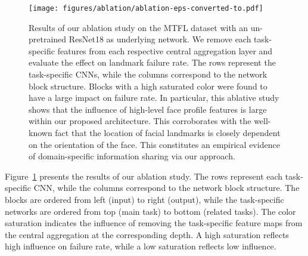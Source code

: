 \documentclass[runningheads]{llncs}
\begin{document}
\begin{figure}[t]
    \centering
    \texttt{[image: figures/ablation/ablation-eps-converted-to.pdf]}
    \caption{Results of our ablation study on the MTFL dataset with an un-pretrained ResNet18 as underlying network. We remove each task-specific features from each respective central aggregation layer and evaluate the effect on landmark failure rate. The rows represent the task-specific CNNs, while the columns correspond to the network block structure. Blocks with a high saturated color were found to have a large impact on failure rate. In particular, this ablative study shows that the influence of high-level face profile features is large within our proposed architecture. This corroborates with the well-known fact that the location of facial landmarks is closely dependent on the orientation of the face. This constitutes an empirical evidence of domain-specific information sharing via our approach.}
    \label{fig:ablation-results}
\end{figure}

Figure~\ref{fig:ablation-results} presents the results of our ablation study. The rows represent each task-specific CNN, while the columns correspond to the network block structure. The blocks are ordered from left (input) to right (output), while the task-specific networks are ordered from top (main task) to bottom (related tasks). The color saturation indicates the influence of removing the task-specific feature maps from the central aggregation at the corresponding depth. A high saturation reflects high influence on failure rate, while a low saturation reflects low influence. 
\end{document}
